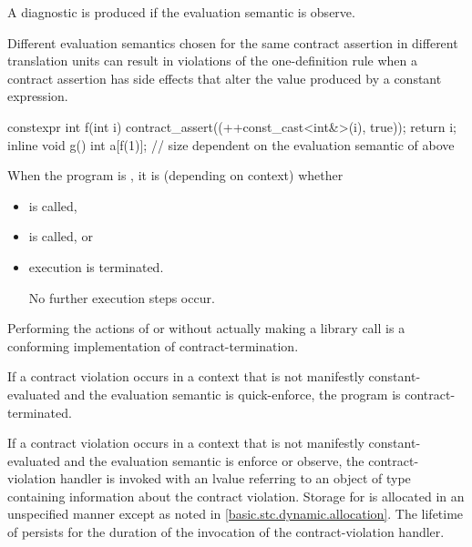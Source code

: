 \begin{note}
A diagnostic is produced
if the evaluation semantic is observe.
\end{note}

\begin{note}
Different evaluation semantics
chosen for the same contract assertion
in different translation units
can result in
violations of the one-definition rule
when a contract assertion has side effects
that alter the value produced by a constant expression.
\begin{example}
\begin{codeblock}
constexpr int f(int i)
{
  contract_assert((++const_cast<int&>(i), true));
  return i;
}
inline void g()
{
  int a[f(1)];  // size dependent on the evaluation semantic of  above
}
\end{codeblock}
\end{example}
\end{note}

\pnum
When the program is ,
it is
(depending on context) whether
\begin{itemize}
\item
{} is called,
\item
{} is called, or
\item
execution is terminated.

\begin{note}
No further execution steps occur.
\end{note}
\end{itemize}

\begin{note}
Performing the actions of
 or 
without actually making a library call
is a conforming implementation of
contract-termination.
\end{note}

\pnum
{}%
%
If a contract violation occurs
in a context that is not manifestly constant-evaluated
and the evaluation semantic is quick-enforce,
the program is contract-terminated.

\pnum
{}%
%
%
%
If a contract violation occurs
in a context that is not manifestly constant-evaluated
and the evaluation semantic is enforce or observe,
the contract-violation handler
is invoked with an lvalue referring to
an object 
of type 
containing information about the contract violation.
Storage for 
is allocated in an unspecified manner
except as noted in \ref{basic.stc.dynamic.allocation}.
The lifetime of 
persists for the duration
of the invocation of the contract-violation handler.

